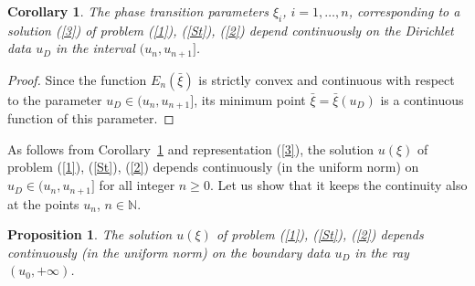 \documentclass[12pt]{article}
\theoremstyle{plain}
\newtheorem{proposition}{Proposition}[section]
\newtheorem{corollary}{Corollary}[section]
\theoremstyle{definition}
\numberwithin{equation}{section}
\newcommand{\N}{{\mathbb N}}
\begin{document}
\begin{corollary}\label{cor1}
The phase transition parameters $\xi_i$, $i=1,\ldots,n$, corresponding to a solution (\ref{3}) of problem (\ref{1}), (\ref{St}), (\ref{2}) depend continuously on the Dirichlet data $u_D$ in the interval $(u_n,u_{n+1}]$.
\end{corollary}
\begin{proof}
Since the function $E_n(\bar\xi)$ is strictly convex and continuous with respect to the parameter $u_D\in (u_n,u_{n+1}]$, its minimum point $\bar\xi=\bar\xi(u_D)$ is a continuous function of this parameter.
\end{proof}
As follows from Corollary~\ref{cor1} and representation (\ref{3}), the solution $u(\xi)$ of problem (\ref{1}), (\ref{St}), (\ref{2}) depends continuously (in the uniform norm) on $u_D\in (u_n,u_{n+1}]$ for all integer $n\ge 0$. Let us show that it keeps the continuity also at the points $u_n$, $n\in\N$.

\begin{proposition}\label{pro1}
The solution $u(\xi)$ of problem (\ref{1}), (\ref{St}), (\ref{2}) depends continuously (in the uniform norm) on the boundary data $u_D$ in the ray $(u_0,+\infty)$.
\end{proposition}
\end{document}
